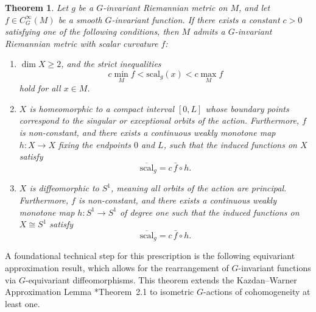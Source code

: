 \documentclass[12pt,a4paper]{amsart}
\theoremstyle{plain}
\newtheorem{theorem}{Theorem}[section]
\theoremstyle{definition}
\theoremstyle{remark}
\newcommand{\ga}{\mathit{g}} %
\begin{document}
\begin{theorem}\label{theorem:GKW}
Let $\ga$ be a $G$-invariant Riemannian metric on $M$, and let $f \in C^\infty_G(M)$ be a smooth $G$-invariant function. If there exists a constant $c > 0$ satisfying one of the following conditions, then $M$ admits a $G$-invariant Riemannian metric with scalar curvature $f$:
\begin{enumerate}[label=\textup{(\alph*)}, font=\upshape]

  \item $\dim X \ge 2$, and the strict inequalities
  $$c\min_M f < \mathrm{scal}_{\ga}(x) < c\max_M f$$
  hold for all $x \in M$.

  \item $X$ is homeomorphic to a compact interval $[0, L]$ whose boundary points correspond to the singular or exceptional orbits of the action. Furthermore, $f$ is non-constant, and there exists a continuous weakly monotone map $h \colon X \to X$ fixing the endpoints $0$ and $L$, such that the induced functions on $X$ satisfy
  $$\overline{\mathrm{scal}}_{\ga} = c\,\bar{f} \circ h.$$

  \item $X$ is diffeomorphic to $S^1$, meaning all orbits of the action are principal. Furthermore, $f$ is non-constant, and there exists a continuous weakly monotone map $h \colon S^1 \to S^1$ of degree one such that the induced functions on $X \cong S^1$ satisfy
  $$\overline{\mathrm{scal}}_{\ga} = c\,\bar{f} \circ h.$$
  
\end{enumerate}
\end{theorem}

A foundational technical step for this prescription is the following equivariant approximation result, which allows for the rearrangement of $G$-invariant functions via $G$-equivariant diffeomorphisms. This theorem extends the Kazdan--Warner Approximation Lemma \cite{kazadanannals}*{Theorem~2.1} to isometric $G$-actions of cohomogeneity at least one.
\end{document}
